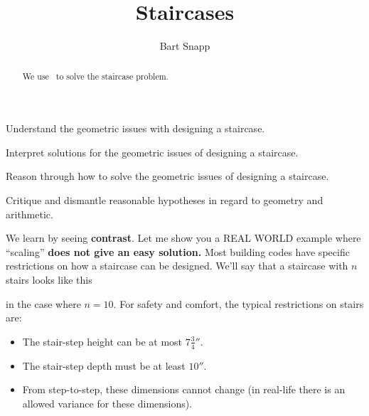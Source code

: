 \documentclass[noauthor,nooutcomes,12pt,handout]{ximera}
\title{Staircases}
\author{Bart Snapp}
\begin{document}
\begin{abstract}
  We use \snap\ to solve the staircase problem.
\end{abstract}
\maketitle

\begin{listOutcomes}
\item{Understand the geometric issues with designing a staircase.}
\item{Interpret solutions for the geometric issues of designing a staircase.}
\item{Reason through how to solve the geometric issues of designing a staircase.}
\item{Critique and dismantle reasonable hypotheses in regard to geometry and arithmetic.}
\end{listOutcomes}

We learn by seeing \textbf{contrast}. Let me show you a REAL WORLD
example where ``scaling'' \textbf{does not give an easy solution.}  Most
building codes have specific restrictions on how a staircase can be
designed. We'll say that a staircase with $n$ stairs looks like this
\begin{center}
\end{center}
in the case where $n=10$. For safety and comfort, the typical
restrictions on stairs are:
\begin{itemize}
\item The stair-step height can be at most $7\frac{3}{4}''$. 
\item The stair-step depth must be at least $10''$.
\item From step-to-step, these dimensions cannot change (in real-life there is
an allowed variance for these dimensions).
\end{itemize}
\end{document}
